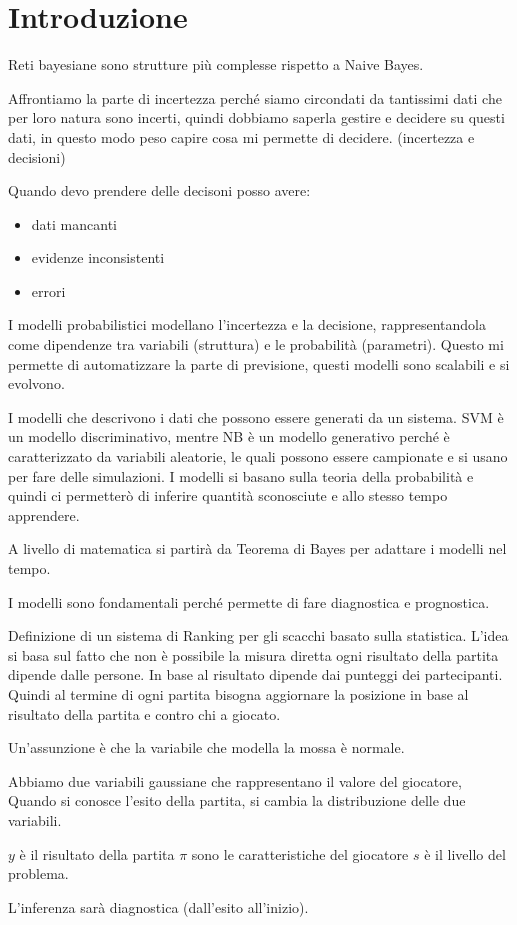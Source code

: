 \chapter{Introduzione}
Reti bayesiane sono strutture più complesse rispetto a Naive Bayes.

Affrontiamo la parte di incertezza perché siamo circondati da tantissimi dati 
che per loro natura sono incerti, quindi dobbiamo saperla gestire e decidere su 
questi dati, in questo modo peso capire cosa mi permette di decidere. (incertezza e decisioni)

Quando devo prendere delle decisoni posso avere:
\begin{itemize}
    \item dati mancanti
    \item evidenze inconsistenti
    \item errori
\end{itemize}

I modelli probabilistici modellano l'incertezza e la decisione, rappresentandola 
come dipendenze tra variabili (struttura) e le probabilità (parametri). Questo 
mi permette di automatizzare la parte di previsione, questi modelli sono scalabili
e si evolvono.

I modelli che descrivono i dati che possono essere generati da un sistema. SVM 
è un modello discriminativo, mentre NB è un modello generativo perché è caratterizzato
da variabili aleatorie, le quali possono essere campionate e si usano per fare delle
simulazioni. I modelli si basano sulla teoria della probabilità e quindi ci permetterò
di inferire quantità sconosciute e allo stesso tempo apprendere.

A livello di matematica si partirà da Teorema di Bayes per adattare i modelli 
nel tempo.

I modelli sono fondamentali perché permette di fare diagnostica e prognostica.

\begin{esempio}
    Definizione di un sistema di Ranking per gli scacchi basato sulla statistica.
    L'idea si basa sul fatto che non è possibile la misura diretta ogni risultato 
    della partita dipende dalle persone. In base al risultato dipende dai punteggi
    dei partecipanti. Quindi al termine di ogni partita bisogna aggiornare la posizione
    in base al risultato della partita e contro chi a giocato.

    Un'assunzione è che la variabile che modella la mossa è normale.

    Abbiamo due variabili gaussiane che rappresentano il valore del giocatore, Quando
    si conosce l'esito della partita, si cambia la distribuzione delle due variabili.
    
    $y$ è il risultato della partita
    $\pi$ sono le caratteristiche del giocatore
    $s$ è il livello del problema.

    L'inferenza sarà diagnostica (dall'esito all'inizio).
\end{esempio}

